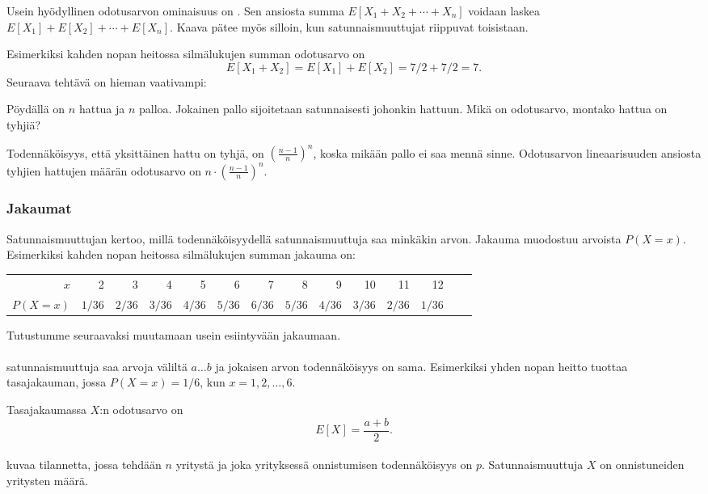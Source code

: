 Usein hyödyllinen odotusarvon ominaisuus on .
Sen ansiosta summa $E[X_1+X_2+\cdots+X_n]$ voidaan laskea $E[X_1]+E[X_2]+\cdots+E[X_n]$.
Kaava pätee myös silloin, kun satunnaismuuttujat riippuvat toisistaan.

Esimerkiksi kahden nopan heitossa silmälukujen summan odotusarvo on
\[E[X_1+X_2]=E[X_1]+E[X_2]=7/2+7/2=7.\]
Seuraava tehtävä on hieman vaativampi:

\begin{task}
Pöydällä on $n$ hattua ja $n$ palloa.
Jokainen pallo sijoitetaan satunnaisesti johonkin hattuun.
Mikä on odotusarvo, montako hattua on tyhjiä?
\end{task}

Todennäköisyys, että yksittäinen hattu on tyhjä,
on $(\frac{n-1}{n})^n$, koska mikään pallo ei saa mennä sinne.
Odotusarvon lineaarisuuden ansiosta tyhjien hattujen
määrän odotusarvo on $n \cdot (\frac{n-1}{n})^n$.

\subsubsection{Jakaumat}


Satunnaismuuttujan  kertoo,
millä todennäköisyydellä satunnaismuuttuja
saa minkäkin arvon.
Jakauma muodostuu arvoista $P(X=x)$.
Esimerkiksi kahden nopan heitossa
silmälukujen summan jakauma on:
\begin{center}
\small {
\begin{tabular}{r|rrrrrrrrrrrrr}
$x$ & 2 & 3 & 4 & 5 & 6 & 7 & 8 & 9 & 10 & 11 & 12 \\
$P(X=x)$ & $1/36$ & $2/36$ & $3/36$ & $4/36$ & $5/36$ & $6/36$ & $5/36$ & $4/36$ & $3/36$ & $2/36$ & $1/36$ \\
\end{tabular}
}
\end{center}
Tutustumme seuraavaksi muutamaan usein esiintyvään jakaumaan.
~\\\\
 satunnaismuuttuja
saa arvoja väliltä $a \ldots b$
ja jokaisen arvon todennäköisyys on sama.
Esimerkiksi yhden nopan heitto tuottaa tasajakauman,
jossa $P(X=x)=1/6$, kun $x=1,2,\ldots,6$.

Tasajakaumassa $X$:n odotusarvo on
\[E[X] = \frac{a+b}{2}.\]
~\\
 kuvaa tilannetta, jossa tehdään $n$
yritystä ja joka yrityksessä onnistumisen
todennäköisyys on $p$. Satunnaismuuttuja $X$
on onnistuneiden yritysten määrä.

